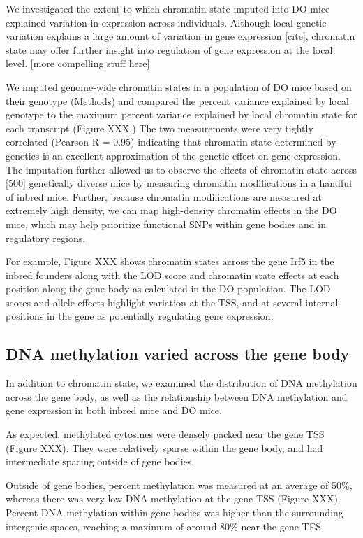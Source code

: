\documentclass[10pt,letterpaper]{article}
\begin{document}
We investigated the extent to which chromatin state imputed into DO mice
explained variation in expression across individuals. Although local
genetic variation explains a large amount of variation in gene
expression {[}cite{]}, chromatin state may offer further insight into
regulation of gene expression at the local level. {[}more compelling
stuff here{]}

We imputed genome-wide chromatin states in a population of DO mice based
on their genotype (Methods) and compared the percent variance explained
by local genotype to the maximum percent variance explained by local
chromatin state for each transcript (Figure XXX.) The two measurements
were very tightly correlated (Pearson R = 0.95) indicating that
chromatin state determined by genetics is an excellent approximation of
the genetic effect on gene expression. The imputation further allowed us
to observe the effects of chromatin state across {[}500{]} genetically
diverse mice by measuring chromatin modifications in a handful of inbred
mice. Further, because chromatin modifications are measured at extremely
high density, we can map high-density chromatin effects in the DO mice,
which may help prioritize functional SNPs within gene bodies and in
regulatory regions.

For example, Figure XXX shows chromatin states across the gene Irf5 in
the inbred founders along with the LOD score and chromatin state effects
at each position along the gene body as calculated in the DO population.
The LOD scores and allele effects highlight variation at the TSS, and at
several internal positions in the gene as potentially regulating gene
expression.

\hypertarget{dna-methylation-varied-across-the-gene-body}{%
\subsection{DNA methylation varied across the gene
body}\label{dna-methylation-varied-across-the-gene-body}}

In addition to chromatin state, we examined the distribution of DNA
methylation across the gene body, as well as the relationship between
DNA methylation and gene expression in both inbred mice and DO mice.

As expected, methylated cytosines were densely packed near the gene TSS
(Figure XXX). They were relatively sparse within the gene body, and had
intermediate spacing outside of gene bodies.

Outside of gene bodies, percent methylation was measured at an average
of 50\%, whereas there was very low DNA methylation at the gene TSS
(Figure XXX). Percent DNA methylation within gene bodies was higher than
the surrounding intergenic spaces, reaching a maximum of around 80\%
near the gene TES.
\end{document}
